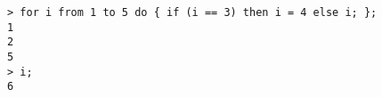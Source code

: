\begin{center}\begin{minipage}{15cm}\begin{Verbatim}[frame=single]
> for i from 1 to 5 do { if (i == 3) then i = 4 else i; };
1
2
5
> i;
6
\end{Verbatim}
\end{minipage}\end{center}

